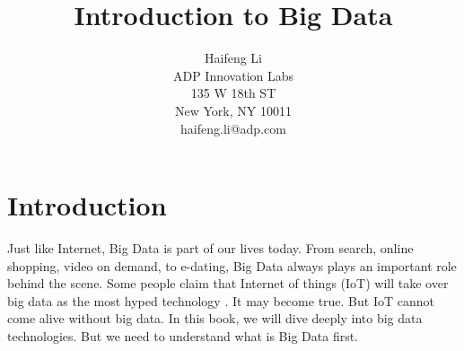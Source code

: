 \documentclass[11pt]{book}
\begin{document}


\title{Introduction to Big Data}

\author{Haifeng Li\\ADP Innovation Labs\\135 W 18th ST\\New York, NY 10011\\haifeng.li@adp.com}



\frontmatter                            %
\maketitle                              %
\tableofcontents                        %
\mainmatter   


\chapter[Introduction]
{Introduction}
Just like Internet, Big Data is part of our lives today. From search, online shopping, video on demand, to e-dating, Big Data always plays an important role behind the scene.
Some people claim that Internet of things (IoT) will take over big data as the most hyped technology \cite{Gartner2014}. It may become true. But IoT cannot come alive without big data.
In this book, we will dive deeply into big data technologies. But we need to understand what is Big Data first.
\end{document}
